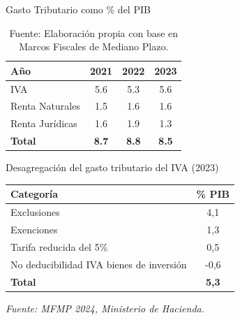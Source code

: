 \begin{frame}{Gasto Tributario como \% del PIB}
\begin{table}[H]
\centering
\begin{tabular}{lccc}
\toprule
\textbf{Año} & \textbf{2021} & \textbf{2022} & \textbf{2023} \\
\midrule
IVA              & 5.6 & 5.3 & 5.6 \\
Renta Naturales  & 1.5 & 1.6 & 1.6 \\
Renta Jurídicas  & 1.6 & 1.9 & 1.3 \\
\midrule
\textbf{Total}   & \textbf{8.7} & \textbf{8.8} & \textbf{8.5} \\
\bottomrule
\end{tabular}
\caption*{\footnotesize Fuente: Elaboración propia con base en Marcos Fiscales de Mediano Plazo.}
\end{table}
\end{frame}

\begin{frame}{Desagregación del gasto tributario del IVA (2023)}
\begin{table}[htbp]
\centering
\begin{tabular}{|l|c|}
\hline
\textbf{Categoría} & \textbf{\% PIB} \\
\hline
Exclusiones & 4,1 \\
Exenciones & 1,3 \\
Tarifa reducida del 5\% & 0,5 \\
No deducibilidad IVA bienes de inversión & -0,6 \\
\hline
\textbf{Total} & \textbf{5,3} \\
\hline
\end{tabular}
\vspace{0.2cm}

\footnotesize{\textit{Fuente: MFMP 2024, Ministerio de Hacienda.}}
\end{table}
\end{frame}
